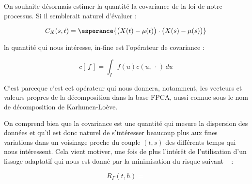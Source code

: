 On souhaite désormais estimer la quantité la covariance de la loi de notre processus. Si il semblerait naturel d'évaluer :

\begin{equation*}
	C_X(s,t) = \esperance{ \bigl(X(t) - \mu(t)\bigr) \cdot \bigl( X(s) - \mu(s) \bigr) }
\end{equation*}

la quantité qui nous intéresse, in-fine est l'opérateur de covariance :

\begin{equation*}
	c[ \, f \,] = \int_I f(u)c(u, \, \cdot \, ) \, du
\end{equation*}

C'est parceque c'est cet opérateur qui nous donnera, notamment, les vecteurs et valeurs propres de la décomposition dans la base FPCA, aussi connue sous le nom de décomposition de Karhunen-Loève.

\bigskip

On comprend bien que la covariance est une quantité qui mesure la dispersion des données et qu'il est donc naturel de s'intéresser beaucoup plus aux fines variations dans un voisinage proche du couple $(t,s)$ des différents temps qui nous intéressent. Cela vient motiver, une fois de plus l'intérêt de l'utilisation d'un lissage adaptatif qui nous est donné par la minimisation du risque suivant ~\cite{maissoro-SmoothnessFTSweakDep} :

\begin{equation*}
	R_\Gamma( t, h ) =
\end{equation*}